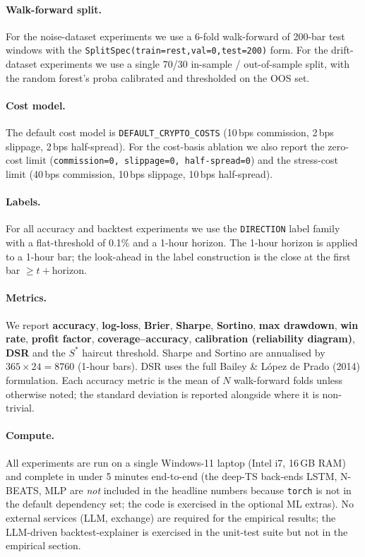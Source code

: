 \documentclass[11pt,a4paper]{article}
\providecommand{\dsr}{\textsc{DSR}}
\providecommand{\srmin}{S^{\ast}}
\begin{document}
\paragraph{Walk-forward split.}
For the noise-dataset experiments we use a 6-fold
walk-forward of 200-bar test windows with the
\texttt{SplitSpec(train=rest,\;val=0,\;test=200)} form.
For the drift-dataset experiments we use a single
70/30 in-sample / out-of-sample split, with the
random forest's proba calibrated and thresholded on the
OOS set.

\paragraph{Cost model.}
The default cost model is
\texttt{DEFAULT\_CRYPTO\_COSTS} (10\,bps commission,
2\,bps slippage, 2\,bps half-spread). For the cost-basis
ablation we also report the zero-cost limit
(\texttt{commission=0, slippage=0, half-spread=0}) and
the stress-cost limit (40\,bps commission, 10\,bps
slippage, 10\,bps half-spread).

\paragraph{Labels.}
For all accuracy and backtest experiments we use the
\texttt{DIRECTION} label family with a flat-threshold of
0.1\% and a 1-hour horizon. The 1-hour horizon is
applied to a 1-hour bar; the look-ahead in the label
construction is the close at the first bar $\geq t +
\text{horizon}$.

\paragraph{Metrics.}
We report
\textbf{accuracy}, \textbf{log-loss}, \textbf{Brier},
\textbf{Sharpe}, \textbf{Sortino}, \textbf{max drawdown},
\textbf{win rate}, \textbf{profit factor},
\textbf{coverage--accuracy}, \textbf{calibration
(reliability diagram)}, \textbf{\dsr{}} and the
$\srmin$ haircut threshold. Sharpe and Sortino are
annualised by $365 \times 24 = 8760$ (1-hour bars).
\dsr{} uses the full Bailey \& López de Prado (2014)
formulation. Each accuracy metric is the mean of $N$
walk-forward folds unless otherwise noted; the standard
deviation is reported alongside where it is non-trivial.

\paragraph{Compute.}
All experiments are run on a single Windows-11 laptop
(Intel i7, 16\,GB RAM) and complete in under 5 minutes
end-to-end (the deep-TS back-ends LSTM, N-BEATS, MLP are
\emph{not} included in the headline numbers because
\texttt{torch} is not in the default dependency set;
the code is exercised in the optional ML extras). No
external services (LLM, exchange) are required for the
empirical results; the LLM-driven backtest-explainer is
exercised in the unit-test suite but not in the
empirical section.
\end{document}
